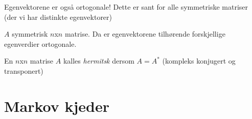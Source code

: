 \documentclass[11pt, a4paper, norsk]{article}
\begin{document}
\begin{Example}{}{}
Egenvektorene er også ortogonale! Dette er sant for alle symmetriske matriser (der vi har distinkte egenvektorer)
        \end{Example}
        
        \begin{Theorem}{}{}
            $A$ symmetrisk $n$x$n$ matrise. Da er egenvektorene tilhørende forskjellige egenverdier ortogonale. 
        \end{Theorem}

        \begin{Definition}{}{}
            En $n$x$n$ matrise $A$ kalles \textit{hermitsk} dersom $A = A^*$ (kompleks konjugert og transponert)
        \end{Definition}

        \section{Markov kjeder}
        
\end{document}
